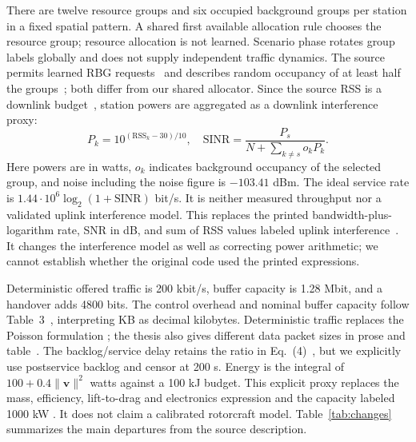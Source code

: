 \documentclass[conference]{IEEEtran}
\begin{document}
There are twelve resource groups and six occupied background groups per
station in a fixed spatial pattern. A shared first available allocation rule
chooses the resource group; resource allocation is not learned. Scenario phase
rotates group labels globally and does not supply independent traffic dynamics.
The source permits learned RBG requests~\cite[p.~9, Sec.~3.3.1;
p.~12, Sec.~5.2]{thesis} and describes random occupancy of at least half the
groups~\cite[p.~14, Sec.~6.1]{thesis}; both differ from our shared allocator.
Since the source RSS is a downlink budget~\cite[p.~7, Eq.~(1)]{thesis}, station powers
are aggregated as a downlink interference proxy:
\begin{equation}
P_k=10^{(\mathrm{RSS}_k-30)/10},\quad
\mathrm{SINR}=\frac{P_s}{N+\sum_{k\ne s}o_kP_k}.
\end{equation}
Here powers are in watts, $o_k$ indicates background occupancy of the selected
group, and noise including the noise figure is $-103.41$ dBm. The ideal service
rate is $1.44\cdot10^6\log_2(1+\mathrm{SINR})$ bit/s. It is neither measured
throughput nor a validated uplink interference model.
This replaces the printed bandwidth-plus-logarithm rate, SNR in dB, and sum of
RSS values labeled uplink interference~\cite[p.~10, Eqs.~(7)--(9)]{thesis}.
It changes the interference model as well as correcting power arithmetic;
we cannot establish whether the original code used the printed expressions.

Deterministic offered traffic is 200 kbit/s, buffer capacity is 1.28 Mbit, and a
handover adds 4800 bits. The control overhead and nominal buffer capacity follow
Table~3~\cite[p.~15]{thesis}, interpreting KB as decimal kilobytes.
Deterministic traffic replaces the Poisson formulation
\cite[pp.~9--10, Eqs.~(5)--(6)]{thesis}; the thesis also gives different data
packet sizes in prose and table~\cite[pp.~14--15, Sec.~6.1, Table~3]{thesis}.
The backlog/service delay retains the ratio in Eq.~(4)~\cite[p.~9]{thesis},
but we explicitly use postservice backlog and censor at 200 s.
Energy is the integral
of $100+0.4\|\mathbf v\|^2$ watts against a 100 kJ budget. This explicit proxy
replaces the mass, efficiency, lift-to-drag and electronics expression
\cite[p.~10, Eq.~(10)]{thesis} and the capacity labeled 1000 kW
\cite[p.~15, Table~3]{thesis}. It does not claim a calibrated rotorcraft model.
Table~\ref{tab:changes}
summarizes the main departures from the source description.
\end{document}
